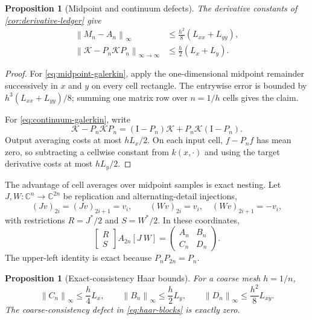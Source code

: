 \documentclass[11pt]{article}
\newtheorem{proposition}[theorem]{Proposition}
\theoremstyle{definition}
\theoremstyle{remark}
\newcommand{\C}{\mathbb C}
\newcommand{\Id}{\mathrm I}
\newcommand{\cK}{\mathcal K}
\newcommand{\norm}[1]{\left\lVert #1\right\rVert}
\begin{document}
\begin{proposition}[Midpoint and continuum defects]
\label{prop:defects}
The derivative constants of \cref{cor:derivative-ledger} give
\begin{align}
 \norm{M_n-A_n}_\infty
 &\le\frac{h^2}{8}(L_{xx}+L_{yy}),
 \label{eq:midpoint-galerkin}\\
 \norm{\cK-P_n\cK P_n}_{\infty\to\infty}
 &\le\frac h2(L_x+L_y).
 \label{eq:continuum-galerkin}
\end{align}
\end{proposition}

\begin{proof}
For \eqref{eq:midpoint-galerkin}, apply the one-dimensional midpoint
remainder successively in $x$ and $y$ on every cell rectangle.  The
entrywise error is bounded by
$h^3(L_{xx}+L_{yy})/8$; summing one matrix row over $n=1/h$ cells gives the
claim.

For \eqref{eq:continuum-galerkin}, write
\[
 \cK-P_n\cK P_n=(\Id-P_n)\cK+P_n\cK(\Id-P_n).
\]
Output averaging costs at most $hL_x/2$.  On each input cell,
$f-P_nf$ has mean zero, so subtracting a cellwise constant from
$k(x,\cdot)$ and using the target derivative costs at most $hL_y/2$.
\end{proof}

The advantage of cell averages over midpoint samples is exact nesting.
Let $J,W:\C^n\to\C^{2n}$ be replication and alternating-detail injections,
\[
 (Jv)_{2i}=(Jv)_{2i+1}=v_i,\qquad
 (Wv)_{2i}=v_i,\quad(Wv)_{2i+1}=-v_i,
\]
with restrictions $R=J^*/2$ and $S=W^*/2$.  In these coordinates,
\begin{equation}
 \begin{bmatrix}R\\S\end{bmatrix}
 A_{2n}[J\ W]
 =
 \begin{pmatrix}
 A_n&B_n\\
 C_n&D_n
 \end{pmatrix}.
 \label{eq:haar-blocks}
\end{equation}
The upper-left identity is exact because
$P_nP_{2n}=P_n$.

\begin{proposition}[Exact-consistency Haar bounds]
\label{prop:haar}
For a coarse mesh $h=1/n$,
\begin{equation}
 \norm{C_n}_\infty\le\frac h4L_x,\qquad
 \norm{B_n}_\infty\le\frac h2L_y,\qquad
 \norm{D_n}_\infty\le\frac{h^2}{8}L_{xy}.
 \label{eq:haar-bounds}
\end{equation}
The coarse-consistency defect in \eqref{eq:haar-blocks} is exactly zero.
\end{proposition}
\end{document}
